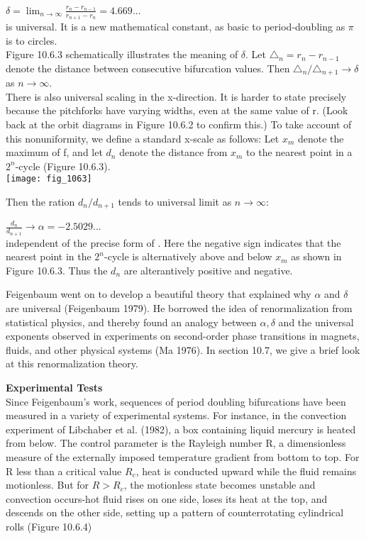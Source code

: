 \documentclass{article}
\newcommand\tab[1][1cm]{\hspace*{#1}}
\begin{document}
$\delta = \lim_{n \to \infty}\frac{r_{n}-r_{n-1}}{r_{n+1}-r_{n}}=4.669...$ \\
is universal. It is a new mathematical constant, as basic to period-doubling as $\pi$ is to circles. \\ \tab
Figure 10.6.3 schematically illustrates the meaning of $\delta$. Let $\triangle_{n}=r_{n}-r_{n-1}$ denote the distance between consecutive bifurcation values. Then $\triangle_{n}/\triangle_{n+1} \to \delta$ as $n \to \infty$. \\ \tab
There is also universal scaling in the x-direction. It is harder to state precisely because the pitchforks have varying widths, even at the same value of r. (Look back at the orbit diagrams in Figure 10.6.2 to confirm this.) To take account of this nonuniformity, we define a standard x-scale as follows: Let $x_{m}$ denote the maximum of f, and let $d_{n}$ denote the distance from $x_{m}$ to the nearest point in a $2^{n}$-cycle (Figure 10.6.3). \\

\texttt{[image: fig\_1063]}

Then the ration $d_{n}/d_{n+1}$ tends to universal limit as $n \to \infty$: \\ \tab \tab

$\frac{d_{n}}{d_{n+1}} \to \alpha = -2.5029$... \\

independent of the precise form of . Here the negative sign indicates that the nearest point in the $2^{n}$-cycle is alternatively above and below $x_{m}$ as shown in Figure 10.6.3. Thus the $d_{n}$ are alterantively positive and negative.

Feigenbaum went on to develop a beautiful theory that explained why $\alpha$ and $\delta$ are universal (Feigenbaum 1979). He borrowed the idea of renormalization from statistical physics, and thereby found an analogy between $\alpha, \delta$ and the universal exponents observed in experiments on second-order phase transitions in magnets, fluids, and other physical systems (Ma 1976). In section 10.7, we give a brief look at this renormalization theory. 

\textbf {Experimental Tests} \\ \tab
Since Feigenbaum's work, sequences of period doubling bifurcations have been measured in a variety of experimental systems. For instance, in the convection experiment of Libchaber et al. (1982), a box containing liquid mercury is heated from below. The control parameter is the Rayleigh number R, a dimensionless measure of the externally imposed temperature gradient from bottom to top. For R less than a critical value $R_{c}$, heat is conducted upward while the fluid remains motionless. But for $R>R_{c}$, the motionless state becomes unstable and convection occurs-hot fluid rises on one side, loses its heat at the top, and descends on the other side, setting up a pattern of counterrotating cylindrical rolls (Figure 10.6.4) \\
\end{document}
